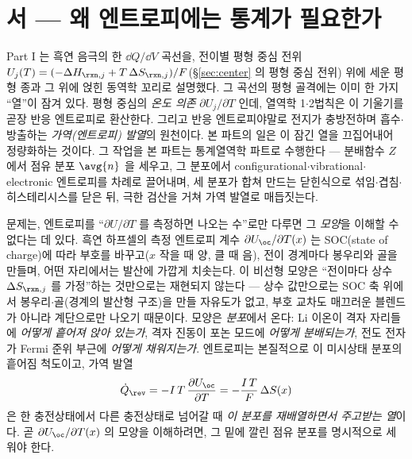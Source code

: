 \section*{서 --- 왜 엔트로피에는 통계가 필요한가}

Part I 는 흑연 음극의 한 $\dd Q/\dd V$ 곡선을, 전이별 평형 중심 전위
$U_j(T)=(-\Delta H_{\rxn,j}+T\,\Delta S_{\rxn,j})/F$(\S\ref{sec:center} 의 평형 중심 전위) 위에 세운 평형 종과 그 위에
얹힌 동역학 꼬리로 설명했다. 그 곡선의 평형 골격에는 이미 한 가지 ``열''이 잠겨 있다. 평형 중심의
\emph{온도 의존} $\partial U_j/\partial T$ 인데, 열역학 1$\cdot$2법칙은 이 기울기를 곧장 반응 엔트로피로 환산한다.
그리고 반응 엔트로피야말로 전지가 충방전하며 흡수$\cdot$방출하는 \emph{가역(엔트로피) 발열}의 원천이다.
본 파트의 일은 이 잠긴 열을 끄집어내어 정량화하는 것이다. 그 작업을 본 파트는 통계열역학 파트로 수행한다 ---
분배함수 $Z$ 에서 점유 분포 $\avg{n}$ 을 세우고, 그 분포에서 configurational$\cdot$vibrational$\cdot$electronic
엔트로피를 차례로 끌어내며, 세 분포가 합쳐 만드는 닫힌식으로 섞임$\cdot$겹침$\cdot$히스테리시스를 닫은 뒤,
극한 검산을 거쳐 가역 발열로 매듭짓는다.

문제는, 엔트로피를 ``$\partial U/\partial T$ 를 측정하면 나오는 수''로만 다루면 그 \emph{모양}을 이해할 수
없다는 데 있다. 흑연 하프셀의 측정 엔트로피 계수 $\partial U_\oc/\partial T(x)$ 는 SOC(state of charge)에 따라
부호를 바꾸고($x$ 작을 때 양, 클 때 음), 전이 경계마다 봉우리와 골을 만들며, 어떤 자리에서는 발산에 가깝게
치솟는다. 이 비선형 모양은 ``전이마다 상수 $\Delta S_{\rxn,j}$ 를 가정''하는 것만으로는 재현되지
않는다 --- 상수 값만으로는 SOC 축 위에서 봉우리$\cdot$골(경계의 발산형 구조)을 만들 자유도가 없고,
부호 교차도 매끄러운 블렌드가 아니라 계단으로만 나오기 때문이다.
모양은 \emph{분포}에서 온다: Li 이온이 격자 자리들에 \emph{어떻게 흩어져 앉아 있는가}, 격자 진동이 포논
모드에 \emph{어떻게 분배되는가}, 전도 전자가 Fermi 준위 부근에 \emph{어떻게 채워지는가}. 엔트로피는 본질적으로
이 미시상태 분포의 흩어짐 척도이고, 가역 발열
\[
\dot Q_\rev=-I\,T\,\frac{\partial U_\oc}{\partial T}=-\frac{I\,T}{F}\,\Delta S(x)
\]
은 한 충전상태에서 다른 충전상태로 넘어갈 때 \emph{이 분포를 재배열하면서 주고받는 열}이다. 곧
$\partial U_\oc/\partial T(x)$ 의 모양을 이해하려면, 그 밑에 깔린 점유 분포를 명시적으로 세워야 한다.


